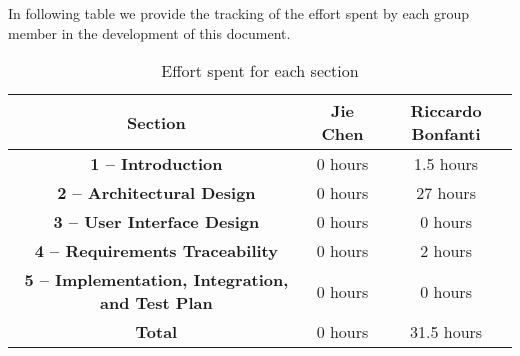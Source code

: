 In following table we provide the tracking of the effort spent by each group member in the development of this document.
\begin{table}[H]
    \centering
    \begin{tabular}{|c|c|c|}
    \hline
    \rowcolor{bluepoli!40}
    \textbf{Section} & \textbf{Jie Chen} & \textbf{Riccardo Bonfanti} \T\B \\
    \hline
     \textbf{1 – Introduction}                  & 0 hours & 1.5 hours \T\B \\
     \textbf{2 – Architectural Design}           & 0 hours & 27 hours \T\B\\
     \textbf{3 – User Interface Design}         & 0 hours & 0 hours \T\B\\
     \textbf{4 – Requirements Traceability}   & 0 hours & 2 hours  \T\B \\
     \textbf{5 – Implementation, Integration, and Test Plan}   & 0 hours & 0 hours  \T\B \\
     \hline
     \textbf{Total}                             & 0 hours & 31.5 hours \T\B \\

    \hline
    \end{tabular}
    \\[10pt]
    \caption{Effort spent for each section}\label{table:effort}
\end{table}